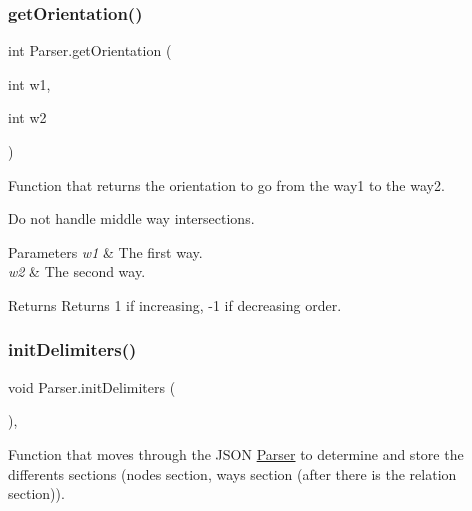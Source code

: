 \subsubsection{\texorpdfstring{get\+Orientation()}{getOrientation()}}
{\footnotesize\ttfamily int Parser.\+get\+Orientation (\begin{DoxyParamCaption}\item[{int}]{w1,  }\item[{int}]{w2 }\end{DoxyParamCaption})\hspace{0.3cm}{\ttfamily [inline]}}



Function that returns the orientation to go from the way1 to the way2. 

Do not handle middle way intersections.


\begin{DoxyParams}{Parameters}
{\em w1} & The first way.\\
\hline
{\em w2} & The second way.\\
\hline
\end{DoxyParams}
\begin{DoxyReturn}{Returns}
Returns 1 if increasing, -\/1 if decreasing order.
\end{DoxyReturn}
\mbox{\label{classParser_a43282c4f0874c45a64a6daf25cae6e31}} 
\subsubsection{\texorpdfstring{init\+Delimiters()}{initDelimiters()}}
{\footnotesize\ttfamily void Parser.\+init\+Delimiters (\begin{DoxyParamCaption}{ }\end{DoxyParamCaption})\hspace{0.3cm}{\ttfamily [inline]}, {\ttfamily [private]}}



Function that moves through the J\+S\+ON \hyperlink{classParser}{Parser} to determine and store the differents sections (nodes section, ways section (after there is the relation section)). 

\mbox{\label{classParser_a01de6e0804b215480d23b0b6ba23105d}} 
